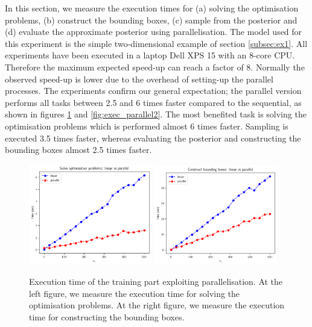 In this section, we measure the execution times for (a) solving the optimisation problems, (b) construct the bounding boxes, (c) sample from the posterior and (d) evaluate the approximate posterior using parallelisation. The model used for this experiment is the simple two-dimensional example of section \ref{subsec:ex1}. All experiments
have been executed in a laptop Dell XPS 15 with an 8-core CPU. Therefore the maximum expected speed-up can reach a factor of 8. Normally the observed speed-up is lower due to the overhead of setting-up the parallel processes. The experiments confirm our general expectation; the parallel version performs all tasks between 2.5 and 6 times faster compared to the sequential, as shown in figures \ref{fig:exec_parallel} and \ref{fig:exec_parallel2}. The most benefited task is solving the optimisation problems which is performed almost 6 times faster. Sampling is executed 3.5 times faster, whereas evaluating the posterior and constructing the bounding boxes almost 2.5 times faster. 

\begin{figure}[ht]
    \begin{center}
      \includegraphics[width=0.48\textwidth]{./Thesis/images/chapter4/solve_problems_parallel.png}
      \includegraphics[width=0.48\textwidth]{./Thesis/images/chapter4/estimate_regions_parallel.png}
    \end{center}
    \caption[Execution time of the training part exploiting parallelisation]{Execution
      time of the training part exploiting parallelisation. At the left figure, we measure
      the execution time for solving the optimisation problems. At the
      right figure, we measure the execution time for constructing the
      bounding boxes.}
  \label{fig:exec_parallel}
\end{figure}


